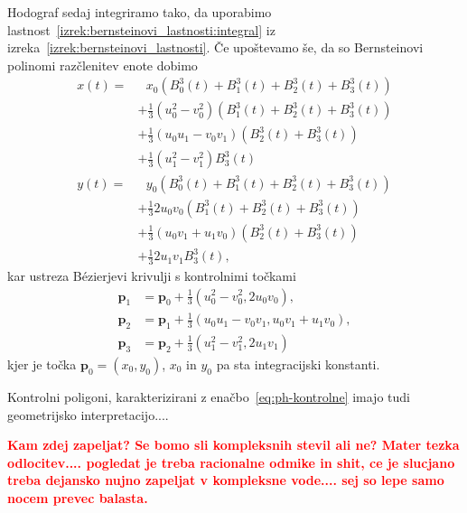 \documentclass[isrm2, tisk]{fmfdelo}
\newcommand{\p}{\mathbf{p}}
\newcommand{\mycomment}[1]{\textbf{\textcolor{red}{#1}}}
\begin{document}
    Hodograf sedaj integriramo tako, da uporabimo lastnost~\ref{izrek:bernsteinovi_lastnosti:integral} iz izreka~\ref{izrek:bernsteinovi_lastnosti}.
    Če upoštevamo še, da so Bernsteinovi polinomi razčlenitev enote dobimo
    \begin{align*}
        x(t) = &\ \ \ x_0(B_{0}^{3}(t) + B_{1}^{3}(t) + B_{2}^{3}(t)+ B_{3}^{3}(t)) \\
        &+ \frac{1}{3}(u_0^2-v_0^2)(B_{1}^{3}(t) + B_{2}^{3}(t)+ B_{3}^{3}(t)) \\
        &+ \frac{1}{3}(u_0u_1-v_0v_1)(B_{2}^{3}(t)+ B_{3}^{3}(t)) \\
        &+ \frac{1}{3} (u_1^2-v_1^2)B_{3}^{3}(t)\\
        y(t) = &\ \ \  y_0(B_{0}^{3}(t) + B_{1}^{3}(t) + B_{2}^{3}(t)+ B_{3}^{3}(t)) \\
        &+ \frac{1}{3}2u_0 v_0(B_{1}^{3}(t) + B_{2}^{3}(t)+ B_{3}^{3}(t)) \\
        &+ \frac{1}{3}(u_0v_1+u_1v_0)(B_{2}^{3}(t)+ B_{3}^{3}(t)) \\
        &+ \frac{1}{3} 2u_1 v_1 B_{3}^{3}(t),
    \end{align*}
    kar ustreza Bézierjevi krivulji s kontrolnimi točkami
    \begin{align}
        \p_1 &=\p_0+\frac{1}{3}(u_0^2-v_0^2,2u_0v_0), \nonumber\\
        \p_2 &= \p_1+\frac{1}{3}(u_0u_1-v_0v_1, u_0v_1+u_1v_0),\nonumber\\
        \p_3 &= \p_2 + \frac{1}{3}(u_1^2-v_1^2, 2u_1v_1) \label{eq:ph-kontrolne}
    \end{align}
    kjer je točka $\p_0=(x_0,y_0)$, $x_0$ in $y_0$ pa sta integracijski konstanti.

    Kontrolni poligoni, karakterizirani z enačbo~\eqref{eq:ph-kontrolne} imajo tudi geometrijsko interpretacijo....

    \mycomment{ Kam zdej zapeljat? Se bomo sli kompleksnih stevil ali ne? Mater tezka odlocitev.... pogledat je treba racionalne odmike in shit, ce je slucjano treba dejansko nujno zapeljat v kompleksne vode.... sej so lepe samo nocem prevec balasta.}
\end{document}

